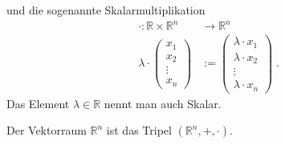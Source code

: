 und die sogenannte Skalarmultiplikation 
\begin{align*}
\cdot : \mathbb{R} \times  \mathbb{R}^n   & \to \mathbb{R}^n \\
\lambda \cdot \begin{pmatrix}
x_1 \\ x_2 \\ \vdots \\ x_n
\end{pmatrix}  
&  :=  \begin{pmatrix}
\lambda  \cdot x_1  \\  \lambda \cdot x_2 \\ \vdots \\  \lambda \cdot x_n 
\end{pmatrix} \; . 
\end{align*}
Das Element $\lambda  \in \mathbb{R}$ nennt man auch Skalar.
\begin{Definition}
Der Vektorraum $\mathbb{R}^n$ ist das Tripel 
$(\mathbb{R}^n, + , \cdot )$.
\end{Definition}

